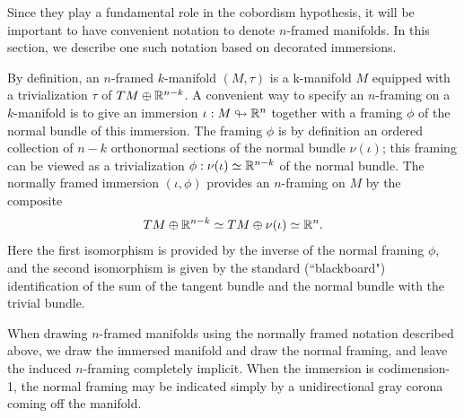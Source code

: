 \documentclass{amsart}
\begin{document}
Since they play a fundamental role in the cobordism hypothesis, it will be important to have convenient notation to denote $n$-framed manifolds.  In this section, we describe one such notation based on decorated immersions.

By definition, an $n$-framed $k$-manifold $(M,\tau)$ is a k-manifold $M$ equipped with a trivialization $\tau$ of $TM \oplus \mathbb R^{n-k}$.  A convenient way to specify an $n$-framing on a $k$-manifold is to give an immersion $\iota: M \looparrowright \mathbb R^n$ together with a framing $\phi$ of the normal bundle of this immersion.  The framing $\phi$ is by definition an ordered collection of $n-k$ orthonormal sections of the normal bundle $\nu(\iota)$; this framing can be viewed as a trivialization $\phi: \nu(\iota) \simeq \mathbb R^{n-k}$ of the normal bundle.  The normally framed immersion $(\iota, \phi)$ provides an $n$-framing on $M$ by the composite
\[TM \oplus \mathbb R^{n-k} \simeq TM \oplus \nu(\iota) \simeq  \mathbb R^n.\]
Here the first isomorphism is provided by the inverse of the normal framing $\phi$, and the second isomorphism is given by the standard (``blackboard") identification of the sum of the tangent bundle and the normal bundle with the trivial bundle.

When drawing $n$-framed manifolds using the normally framed notation described above, we draw the immersed manifold and draw the normal framing, and leave the induced $n$-framing completely implicit.  When the immersion is codimension-1, the normal framing may be indicated simply by a unidirectional gray corona coming off the manifold.  %
\end{document}
